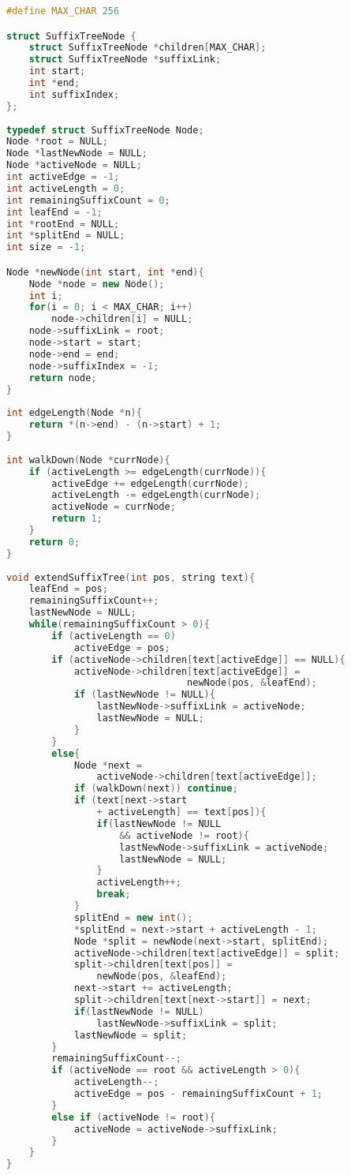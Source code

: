 \begin{lstlisting}[language=C++]
#define MAX_CHAR 256

struct SuffixTreeNode {
    struct SuffixTreeNode *children[MAX_CHAR];
    struct SuffixTreeNode *suffixLink;
    int start;
    int *end;
    int suffixIndex;
};
 
typedef struct SuffixTreeNode Node;
Node *root = NULL;
Node *lastNewNode = NULL;
Node *activeNode = NULL;
int activeEdge = -1;
int activeLength = 0;
int remainingSuffixCount = 0;
int leafEnd = -1;
int *rootEnd = NULL;
int *splitEnd = NULL;
int size = -1;

Node *newNode(int start, int *end){
    Node *node = new Node();
    int i;
    for(i = 0; i < MAX_CHAR; i++)
        node->children[i] = NULL;
    node->suffixLink = root;
    node->start = start;
    node->end = end;
    node->suffixIndex = -1;
    return node;
}
 
int edgeLength(Node *n){
    return *(n->end) - (n->start) + 1;
}
 
int walkDown(Node *currNode){
    if (activeLength >= edgeLength(currNode)){
        activeEdge += edgeLength(currNode);
        activeLength -= edgeLength(currNode);
        activeNode = currNode;
        return 1;
    }
    return 0;
}
 
void extendSuffixTree(int pos, string text){
    leafEnd = pos;
    remainingSuffixCount++;
    lastNewNode = NULL;
    while(remainingSuffixCount > 0){
        if (activeLength == 0)
            activeEdge = pos;
        if (activeNode->children[text[activeEdge]] == NULL){
            activeNode->children[text[activeEdge]] =
                                newNode(pos, &leafEnd);
            if (lastNewNode != NULL){
                lastNewNode->suffixLink = activeNode;
                lastNewNode = NULL;
            }
        }
        else{
            Node *next = 
                activeNode->children[text[activeEdge]];
            if (walkDown(next)) continue;
            if (text[next->start 
                + activeLength] == text[pos]){
                if(lastNewNode != NULL 
                    && activeNode != root){
                    lastNewNode->suffixLink = activeNode;
                    lastNewNode = NULL;
                }
                activeLength++;
                break;
            }
            splitEnd = new int();
            *splitEnd = next->start + activeLength - 1;
            Node *split = newNode(next->start, splitEnd);
            activeNode->children[text[activeEdge]] = split;
            split->children[text[pos]] = 
                newNode(pos, &leafEnd);
            next->start += activeLength;
            split->children[text[next->start]] = next;
            if(lastNewNode != NULL)
                lastNewNode->suffixLink = split;
            lastNewNode = split;
        }
        remainingSuffixCount--;
        if (activeNode == root && activeLength > 0){
            activeLength--;
            activeEdge = pos - remainingSuffixCount + 1;
        }
        else if (activeNode != root){
            activeNode = activeNode->suffixLink;
        }
    }
}
 

\end{lstlisting}
